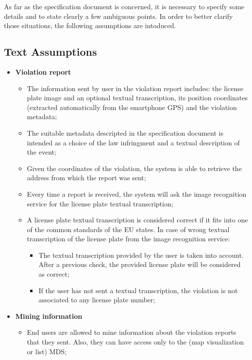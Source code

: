As far as the specification document is concerned, it is necessary to specify some details and to state clearly a few ambiguous points. In order to better clarify those situations, the following assumptions are intoduced.
\subsection{Text Assumptions}
\begin{itemize}
    \item \textbf{Violation report}
        \begin{itemize}
            \item The information sent by user in the violation report includes: the license plate image and an optional textual transcription, its position coordinates (extracted automatically from the smartphone GPS) and the violation metadata;
            \item The suitable metadata descripted in the specification document is intended as a choice of the law infringment and a textual description of the event;
            \item Given the coordinates of the violation, the system is able to retrieve the address from which the report was sent;
            \item Every time a report is received, the system will ask the image recognition service for the license plate textual transcription;
            \item A license plate textual transcription is considered correct if it fits into one of the common standards of the EU states. In case of wrong textual transcription of the license plate from the image recognition service:
            \begin{itemize}
                \item The textual transcription provided by the user is taken into account. After a previous check, the provided license plate will be considered as correct;
                \item If the user has not sent a textual transcription, the violation is not associated to any license plate number;
            \end{itemize} 
        \end{itemize}
    \item \textbf{Mining information} 
        \begin{itemize}
            \item End users are allowed to mine information about the violation reports that they sent. Also, they can have access only to the (map visualization or list) MDS;

\end{itemize}
\end{itemize}
